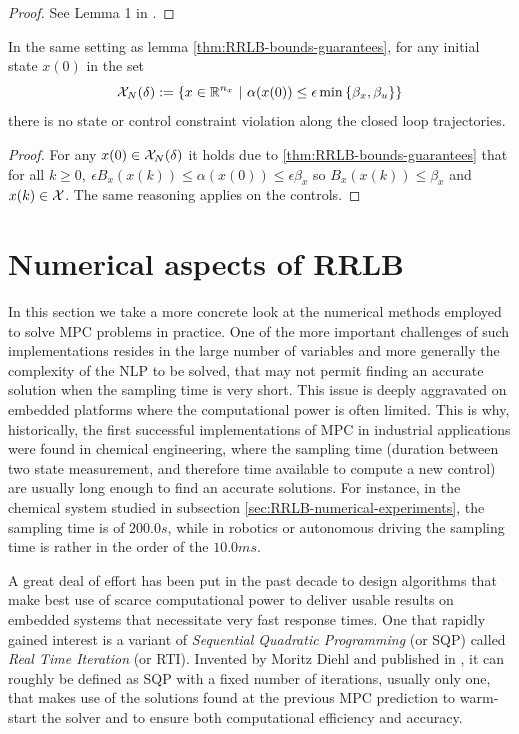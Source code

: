 \documentclass[12pt]{article}
\begin{document}
\begin{proof}
	See Lemma 1 in \cite{RRLB-linear-MPC}.
\end{proof}

\begin{theorem}
	In the same setting as lemma \ref{thm:RRLB-bounds-guarantees}, for any initial state $x(0)$ in the set
	$$\cal{X}_N(\delta):=\left\{x\in\R^{n_x}~|~\alpha(x(0))\leq\epsilon\min\left\{\beta_x,\beta_u\right\}\right\}$$
	there is no state or control constraint violation along the closed loop trajectories.
\end{theorem}

\begin{proof}
	For any $x(0)\in\cal{X}_N(\delta)$ it holds due to \ref{thm:RRLB-bounds-guarantees} that for all $k\geq 0,~\epsilon B_x(x(k))\leq\alpha(x(0))\leq\epsilon\beta_x$ so $B_x(x(k))\leq \beta_x$ and $x(k)\in\cal{X}$.
	The same reasoning applies on the controls.
\end{proof}


\section{Numerical aspects of RRLB}\label{sec:RRLB-numerical-aspects}

In this section we take a more concrete look at the numerical methods employed to solve MPC problems in practice.
One of the more important challenges of such implementations resides in the large number of variables and more generally the complexity of the NLP to be solved, that may not permit finding an accurate solution when the sampling time is very short.
This issue is deeply aggravated on embedded platforms where the computational power is often limited.
This is why, historically, the first successful implementations of MPC in industrial applications were found in chemical engineering, where the sampling time (duration between two state measurement, and therefore time available to compute a new control) are usually long enough to find an accurate solutions.
For instance, in the chemical system studied in subsection \ref{sec:RRLB-numerical-experiments}, the sampling time is of $200.0s$, while in robotics or autonomous driving the sampling time is rather in the order of the $10.0ms$.

A great deal of effort has been put in the past decade to design algorithms that make best use of scarce computational power to deliver usable results on embedded systems that necessitate very fast response times.
One that rapidly gained interest is a variant of \textit{Sequential Quadratic Programming} (or SQP) called \textit{Real Time Iteration} (or RTI).
Invented by Moritz Diehl and published in \cite{rti-diehl}, it can roughly be defined as SQP with a fixed number of iterations, usually only one, that makes use of the solutions found at the previous MPC prediction to warm-start the solver and to ensure both computational efficiency and accuracy.
\end{document}
